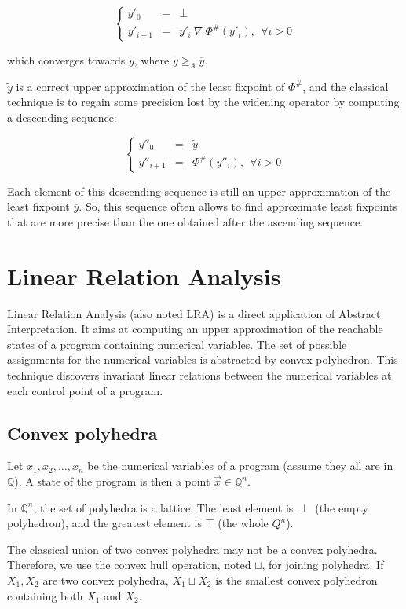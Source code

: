 \documentclass[a4paper,english,titlepage,11pt]{article}
\def\Q{\mathbb{Q}}
\begin{document}
$$\left\{ \begin{array}{rll}
y'_0 &=& \perp \\
y'_{i+1} &=& y'_i\ \nabla\ \Phi^\#(y'_i),\ \ \forall i > 0
\end{array} \right.$$

which converges towards $\tilde{y}$, where $\tilde{y} \geq_A \overline{y}$.

$\tilde{y}$ is a correct upper approximation of the least fixpoint of $\Phi^\#$,
and the classical technique is to regain some precision lost by the widening
operator by computing a descending sequence:

$$\left\{ \begin{array}{rll}
y''_0 &=& \tilde{y} \\
y''_{i+1} &=& \Phi^\#(y''_i), \ \ \forall i > 0
\end{array} \right.$$

Each element of this descending sequence is still an upper approximation of the
least fixpoint $\overline{y}$. So, this sequence often allows to find
approximate least fixpoints that are more precise than the one obtained after
the ascending sequence.

\section{Linear Relation Analysis}

Linear Relation Analysis \cite{CH78} (also noted LRA) is a direct application of
Abstract Interpretation. It aims at computing an upper approximation of the
reachable states of a program containing numerical variables. The set of
possible assignments for the numerical variables is abstracted by convex
polyhedron. This technique discovers invariant linear relations between
the numerical variables at each control point of a program.

\subsection{Convex polyhedra}

Let $x_1, x_2, \dots ,x_n$ be the numerical variables of a program (assume they
all are in $\Q$). A state of
the program is then a point $\overrightarrow{x} \in \Q^n$.

In $\Q^n$, the set of polyhedra is a lattice. The least element is $\perp$
(the empty polyhedron), and the greatest element is $\top$ (the whole $Q^n$).

The classical union of two convex polyhedra may not be a convex polyhedra.
Therefore, we use the convex hull operation, noted $\sqcup$, for joining
polyhedra. 
If $X_1, X_2$ are two convex polyhedra, $X_1 \sqcup X_2$ is the
smallest convex polyhedron containing both $X_1$ and $X_2$.
\end{document}
